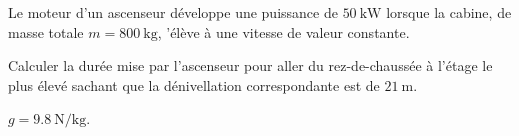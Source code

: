 Le moteur d'un ascenseur développe une puissance de $\qty{50}{\kW}$ lorsque la
cabine, de masse totale $m=\qty{800}{\kg}$, 'élève à une vitesse de valeur
constante.

Calculer la durée mise par l'ascenseur pour aller du rez-de-chaussée à l'étage
le plus élevé sachant que la dénivellation correspondante est de $\qty{21}{\m}$.
\begin{donnees}
	$g=\qty{9.8}{\N\per\kg}$.
\end{donnees}

